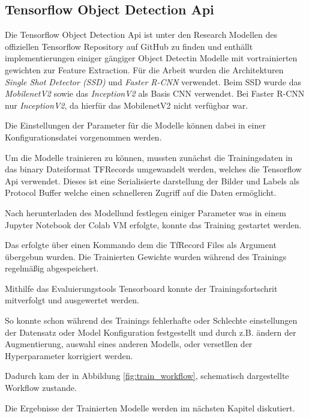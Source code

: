 \subsection{Tensorflow Object Detection Api}

Die Tensorflow Object Detection Api ist unter den Research Modellen
\cite{tfobjdet} des offiziellen Tensorflow Repository auf GitHub zu
finden und enthällt implementierungen einiger gängiger Object Detectin
Modelle mit vortrainierten gewichten zur Feature Extraction.
Für die Arbeit wurden die Architekturen \textit{Single Shot Detector (SSD)}
und \textit{Faster R-CNN} verwendet.
Beim SSD wurde das \textit{MobilenetV2} sowie das \textit{InceptionV2} 
als Basis CNN verwendet.
Bei Faster R-CNN nur \textit{InceptionV2}, da hierfür das MobilenetV2 
nicht verfügbar war.

Die Einstellungen der Parameter für die Modelle können dabei 
in einer Konfigurationsdatei vorgenommen werden.


Um die Modelle trainieren zu können, mussten zunächst die 
Trainingsdaten in das binary Dateiformat TFRecords umgewandelt 
werden, welches die Tensorflow Api verwendet. Dieses ist eine Serialisierte 
darstellung der Bilder und Labels als Protocol Buffer welche einen 
schnelleren Zugriff auf die Daten ermöglicht.

Nach herunterladen des Modellund festlegen einiger Parameter was in 
einem Jupyter Notebook der Colab VM erfolgte, konnte das Training 
gestartet werden. 

Das erfolgte über einen Kommando dem die TfRecord Files als Argument 
übergebun wurden. 
Die Trainierten Gewichte wurden während des Trainings regelmäßig abgespeichert.

Mithilfe das Evaluierungstools Tensorboard konnte der Trainingsfortschrit 
mitverfolgt und ausgewertet werden.

So konnte schon während des Trainings fehlerhafte oder 
Schlechte einstellungen der Datensatz oder Model Konfiguration 
festgestellt und durch z.B. ändern der Augmentierung, auswahl 
eines anderen Modells, oder versetllen der Hyperparameter 
korrigiert werden.

Dadurch kam der in Abbildung \ref{fig:train_workflow},
schematisch dargestellte Workflow zustande. 

Die Ergebnisse der Trainierten Modelle 
werden im nächsten Kapitel diskutiert.


%     

